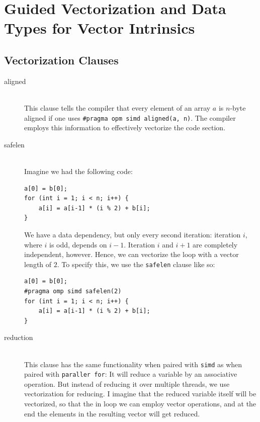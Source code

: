 \documentclass[../../main.tex]{subfiles}
\begin{document}
\newcommand{\drawcells}[3]{%
    \begin{tikzpicture}
        \foreach \j in {1,...,#1} {
            \node[draw, fill=#3!20, minimum width = \linewidth/#1, minimum height=0.5cm, align=center] (cell\j) at (\j*\linewidth/#1, 0) {#2};
        }
    \end{tikzpicture}}
\section{Guided Vectorization and Data Types for Vector Intrinsics}
\subsection{Vectorization Clauses}
\begin{description}
    \item[aligned] ~\\ This clause tells the compiler that every element of an array $a$ is $n$-byte aligned if one uses \texttt{\#pragma opm simd aligned(a, n)}. The compiler employs this information to effectively vectorize the code section.
    \bigskip
    \item[safelen] ~\\ Imagine we had the following code:
    \begin{lstlisting}
a[0] = b[0];
for (int i = 1; i < n; i++) {
    a[i] = a[i-1] * (i % 2) + b[i];
}
    \end{lstlisting}
    We have a data dependency, but only every second iteration: iteration $i$, where $i$ is odd, depends on $i-1$. Iteration $i$ and $i+1$ are completely independent, however. Hence, we can vectorize the loop with a vector length of $2$. To specify this, we use the \texttt{safelen} clause like so:
    \begin{lstlisting}
a[0] = b[0];
#pragma omp simd safelen(2)
for (int i = 1; i < n; i++) {
    a[i] = a[i-1] * (i % 2) + b[i];
}
    \end{lstlisting}   
    \bigskip
    \item[reduction] ~\\ This clause has the same functionality when paired with \texttt{simd} as when paired with \texttt{paraller for}: It will reduce a variable by an associative operation. But instead of reducing it over multiple threads, we use vectorization for reducing. I imagine that the reduced variable itself will be vectorized, so that the in loop we can employ vector operations, and at the end the elements in the resulting vector will get reduced.
\end{description}
\end{document}
